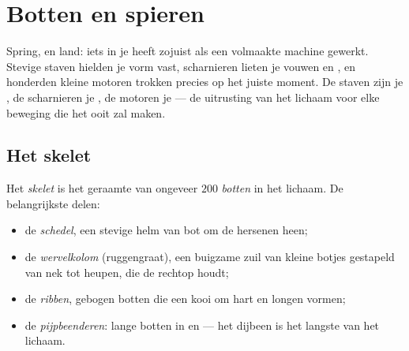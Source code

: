 \chapter{Botten en spieren}\label{ch:g3:bones-and-muscles}

Spring, en land: iets in je heeft zojuist als een volmaakte machine
gewerkt. Stevige staven hielden je vorm vast, scharnieren lieten je
 vouwen en , en honderden kleine motoren trokken precies op
het juiste moment. De staven zijn je , de scharnieren je
, de motoren je  --- de uitrusting van het lichaam
voor elke beweging die het ooit zal maken.

\section{Het skelet}

\begin{definition}\label{def:g3:bones-and-muscles:skeleton}
Het \emph{skelet} is het geraamte van ongeveer $200$
\emph{botten} in het lichaam. De belangrijkste delen:
\begin{itemize}
  \item de \emph{schedel}, een stevige helm van bot om
        de hersenen heen;
  \item de \emph{wervelkolom} (ruggengraat), een
        buigzame zuil van kleine botjes gestapeld van nek tot heupen,
        die de  rechtop houdt;
  \item de \emph{ribben}, gebogen botten die een kooi om
        hart en longen vormen;
  \item de \emph{pijpbeenderen}: lange botten in  en  --- het
        dijbeen is het langste van het lichaam.
\end{itemize}
\end{definition}

